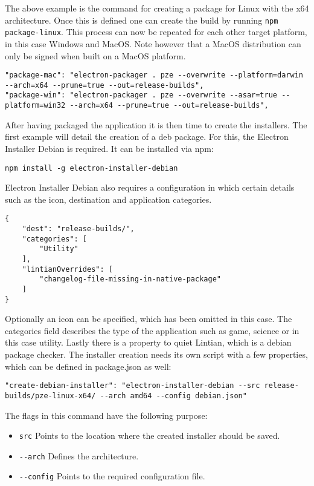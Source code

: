 The above example is the command for creating a package for Linux with the x64 architecture.
Once this is defined one can create the build by running \lstinline[columns=fixed]{npm package-linux}.
This process can now be repeated for each other target platform, in this case Windows and MacOS. 
Note however that a MacOS distribution can only be signed when built on a MacOS platform. \parencite{electronDocsDist}
\begin{lstlisting}[caption=Commands for Windows and MacOs builds specified in package.json]
"package-mac": "electron-packager . pze --overwrite --platform=darwin --arch=x64 --prune=true --out=release-builds",
"package-win": "electron-packager . pze --overwrite --asar=true --platform=win32 --arch=x64 --prune=true --out=release-builds",
\end{lstlisting}
After having packaged the application it is then time to create the installers. 
The first example will detail the creation of a \acrshort{deb} package. 
For this, the Electron Installer Debian is required. 
It can be installed via \acrshort{npm}:
\begin{lstlisting}[caption=Installation of electron-installer-debian]
npm install -g electron-installer-debian
\end{lstlisting}
Electron Installer Debian also requires a configuration in which certain details such as the
icon, destination and application categories. 
\begin{lstlisting}[caption=Configuration for debian package: debian.json]
{
    "dest": "release-builds/",
    "categories": [
        "Utility"
    ],
    "lintianOverrides": [
        "changelog-file-missing-in-native-package"
    ]
}
\end{lstlisting}
Optionally an icon can be specified, which has been omitted in this case. 
The categories field describes the type of the application such as game, science or in this case utility.
Lastly there is a property to quiet Lintian, which is a debian package checker.
The installer creation needs its own script with a few properties, which can be defined in 
package.json as well:
\begin{lstlisting}[caption=Configuration for debian package: debian.json]
"create-debian-installer": "electron-installer-debian --src release-builds/pze-linux-x64/ --arch amd64 --config debian.json"
\end{lstlisting}
The flags in this command have the following purpose:
\begin{itemize}
    \item \lstinline[columns=fixed]{src} Points to the location where the created installer should be saved.
    \item \lstinline[columns=fixed]{--arch} Defines the architecture.
    \item \lstinline[columns=fixed]{--config} Points to the required configuration file.
\end{itemize}
